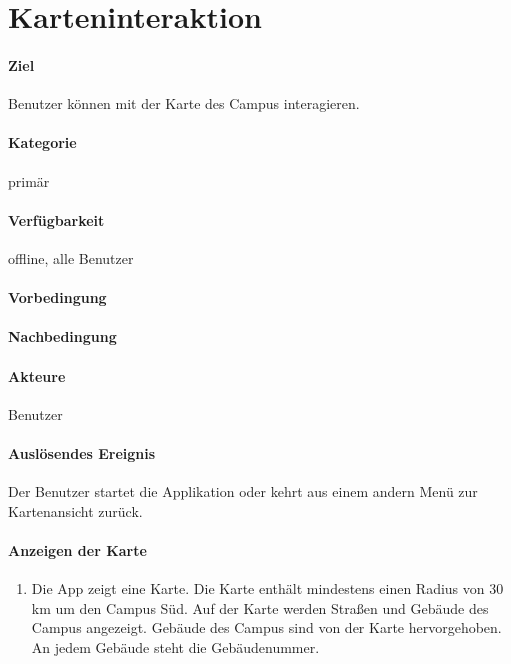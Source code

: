 \section{Karteninteraktion}
\paragraph{Ziel}
Benutzer können mit der Karte des Campus interagieren.
\paragraph{Kategorie}
primär
\paragraph{Verfügbarkeit}
offline, alle Benutzer
\paragraph{Vorbedingung}

\paragraph{Nachbedingung}

\paragraph{Akteure}
Benutzer
\paragraph{Auslösendes Ereignis}
Der Benutzer startet die Applikation oder kehrt aus einem andern Menü zur Kartenansicht zurück.
\paragraph{Anzeigen der Karte}
\begin{enumerate}
    \item Die App zeigt eine Karte. Die Karte enthält mindestens einen Radius von 30 km um den Campus Süd. Auf der Karte werden Straßen und Gebäude des Campus angezeigt. Gebäude des Campus sind von der Karte hervorgehoben. An jedem Gebäude steht die Gebäudenummer.
\end{enumerate}
